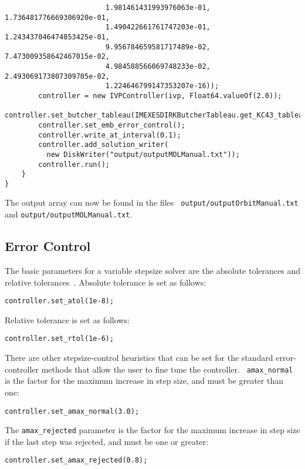 \documentclass[10pt,letterpaper]{article}
\begin{document}
\begin{lstlisting}
                        1.981461431993976063e-01, 1.736481776669306920e-01,
                        1.490422661761747203e-01, 1.243437046474853425e-01,
                        9.956784659581717489e-02, 7.473009358642467015e-02,
                        4.984588566069748233e-02, 2.493069173807309705e-02,
                        1.224646799147353207e-16));
        controller = new IVPController(ivp, Float64.valueOf(2.0));
        controller.set_butcher_tableau(IMEXESDIRKButcherTableau.get_KC43_tableau());
        controller.set_emb_error_control();
        controller.write_at_interval(0.1);
        controller.add_solution_writer(
          new DiskWriter("output/outputMOLManual.txt"));
        controller.run();
    }
}
\end{lstlisting}

The output array can now be found in the files {\tt
output/outputOrbitManual.txt} and {\tt output/outputMOLManual.txt}.

\subsection{Error Control}

The basic parameters for a variable stepsize solver are the absolute tolerances
and relative tolerances~\cite{HairerNorsettWanner1993}. Absolute tolerance is
set as follows:

\begin{lstlisting}
controller.set_atol(1e-8);
\end{lstlisting}

Relative tolerance is set as follows:

\begin{lstlisting}
controller.set_rtol(1e-6);
\end{lstlisting}

There are other stepsize-control heuristics that can be set for the standard
error-controller methods that allow the user to fine tune the controller. {\tt
amax\_normal} is the factor for the maximum increase in step size, and must be
greater than one:

\begin{lstlisting}
controller.set_amax_normal(3.0);
\end{lstlisting}

The {\tt amax\_rejected} parameter is the factor for the maximum increase in step
size if the last step was rejected, and must be one or greater:

\begin{lstlisting}
controller.set_amax_rejected(0.8);
\end{lstlisting}
\end{document}
